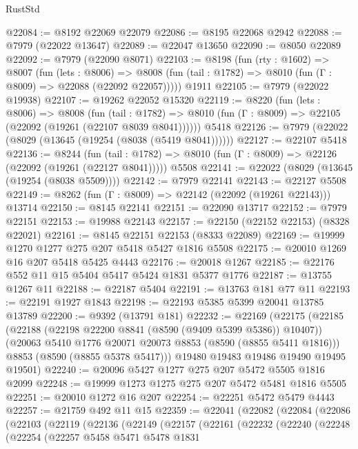 \begin{lexlean}{RustStd}
\begin{coremodule}
@22084 := @8192 @22069 @22079
@22086 := @8195 @22068 @2942
@22088 := @7979 (@22022 @13647)
@22089 := @22047 @13650
@22090 := @8050 @22089
@22092 := @7979 (@22090 @8071)
@22103 := @8198
    (fun (rty : @1602) =>
    @8007
      (fun (lets : @8006) =>
      @8008 (fun (tail : @1782) => @8010 (fun (Γ : @8009) => @22088 (@22092 @22057)))))
    @1911
@22105 := @7979 (@22022 @19938)
@22107 := @19262 @22052 @15320
@22119 := @8220
    (fun (lets : @8006) =>
    @8008
      (fun (tail : @1782) =>
      @8010 (fun (Γ : @8009) => @22105 (@22092 (@19261 (@22107 @8039 @8041))))))
    @5418
@22126 := @7979 (@22022 (@8029 (@13645 (@19254 (@8038 (@5419 @8041))))))
@22127 := @22107 @5418
@22136 := @8244
    (fun (tail : @1782) => @8010 (fun (Γ : @8009) => @22126 (@22092 (@19261 (@22127 @8041)))))
    @5508
@22141 := @22022 (@8029 (@13645 (@19254 (@8038 @5509))))
@22142 := @7979 @22141
@22143 := @22127 @5508
@22149 := @8262 (fun (Γ : @8009) => @22142 (@22092 (@19261 @22143))) @13714
@22150 := @8145 @22141
@22151 := @22090 @13717
@22152 := @7979 @22151
@22153 := @19988 @22143
@22157 := @22150 (@22152 @22153) (@8328 @22021)
@22161 := @8145 @22151 @22153 (@8333 @22089)
@22169 := @19999 @1270 @1277 @275 @207 @5418 @5427 @1816 @5508
@22175 := @20010 @1269 @16 @207 @5418 @5425 @4443
@22176 := @20018 @1267
@22185 := @22176 @552 @11 @15 @5404 @5417 @5424 @1831 @5377 @1776
@22187 := @13755 @1267 @11
@22188 := @22187 @5404
@22191 := @13763 @181 @77 @11
@22193 := @22191 @1927 @1843
@22198 := @22193 @5385 @5399 @20041 @13785 @13789
@22200 := @9392 (@13791 @181)
@22232 := @22169
    (@22175
      (@22185
        (@22188 (@22198 @22200 @8841 (@8590 (@9409 @5399 @5386)) @10407))
        (@20063 @5410 @1776 @20071 @20073 @8853 (@8590 (@8855 @5411 @1816)))
        @8853
        (@8590 (@8855 @5378 @5417)))
      @19480
      @19483
      @19486
      @19490
      @19495
      @19501)
@22240 := @20096 @5427 @1277 @275 @207 @5472 @5505 @1816 @2099
@22248 := @19999 @1273 @1275 @275 @207 @5472 @5481 @1816 @5505
@22251 := @20010 @1272 @16 @207
@22254 := @22251 @5472 @5479 @4443
@22257 := @21759 @492 @11 @15
@22359 := @22041
    (@22082
      (@22084
        (@22086
          (@22103
            (@22119
              (@22136
                (@22149
                  (@22157
                    (@22161
                      (@22232
                        (@22240
                          (@22248
                            (@22254
                              (@22257
                                @5458
                                @5471
                                @5478
                                @1831

\end{coremodule}
\end{lexlean}
